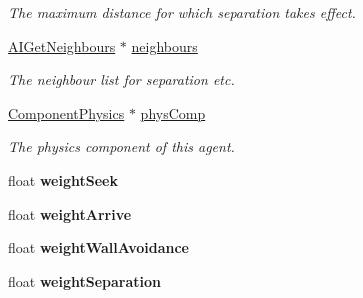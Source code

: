 \begin{DoxyCompactItemize}
\begin{DoxyCompactList}\small\item\em \-The maximum distance for which separation takes effect. \end{DoxyCompactList}\item 
\hypertarget{classAIMovementController_addc735dc467b412a98c0d15fd4581b7c}{
\hyperlink{classAIGetNeighbours}{\-A\-I\-Get\-Neighbours} $\ast$ \hyperlink{classAIMovementController_addc735dc467b412a98c0d15fd4581b7c}{neighbours}}
\label{d2/d30/classAIMovementController_addc735dc467b412a98c0d15fd4581b7c}

\begin{DoxyCompactList}\small\item\em \-The neighbour list for separation etc. \end{DoxyCompactList}\item 
\hypertarget{classAIMovementController_a8f940ad2033bac1311b1a2f22f52fb7a}{
\hyperlink{classComponentPhysics}{\-Component\-Physics} $\ast$ \hyperlink{classAIMovementController_a8f940ad2033bac1311b1a2f22f52fb7a}{phys\-Comp}}
\label{d2/d30/classAIMovementController_a8f940ad2033bac1311b1a2f22f52fb7a}

\begin{DoxyCompactList}\small\item\em \-The physics component of this agent. \end{DoxyCompactList}\item 
\hypertarget{classAIMovementController_a6540cb95d5a8da71ca80a4b3354a371c}{
float {\bfseries weight\-Seek}}
\label{d2/d30/classAIMovementController_a6540cb95d5a8da71ca80a4b3354a371c}

\item 
\hypertarget{classAIMovementController_ae3c033e271d1eb23faf875160fd00861}{
float {\bfseries weight\-Arrive}}
\label{d2/d30/classAIMovementController_ae3c033e271d1eb23faf875160fd00861}

\item 
\hypertarget{classAIMovementController_ae0677a5b2373e8d17418fe2dcae0abc9}{
float {\bfseries weight\-Wall\-Avoidance}}
\label{d2/d30/classAIMovementController_ae0677a5b2373e8d17418fe2dcae0abc9}

\item 
\hypertarget{classAIMovementController_ac71ec0b30e9093879a890302ef951dbb}{
float {\bfseries weight\-Separation}}
\label{d2/d30/classAIMovementController_ac71ec0b30e9093879a890302ef951dbb}

\end{DoxyCompactItemize}
